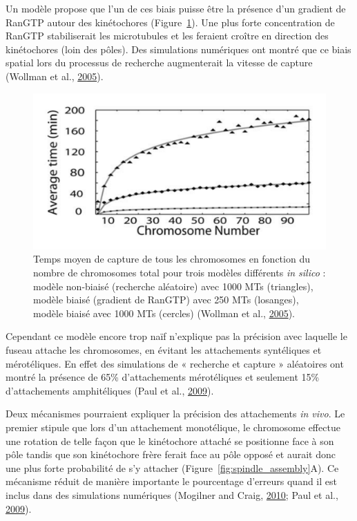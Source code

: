 \documentclass[12pt,a4paper,twoside,openright]{book}
\begin{document}
Un modèle propose que l'un de ces biais puisse être la présence d'un
gradient de RanGTP autour des kinétochores
(Figure~\ref{fig:assembly_time}). Une plus forte concentration de RanGTP
stabiliserait les microtubules et les feraient croître en direction des
kinétochores (loin des pôles). Des simulations numériques ont montré que
ce biais spatial lors du processus de recherche augmenterait la vitesse
de capture (Wollman et al., \hyperref[ref-Wollman2005]{2005}).

\begin{figure}[htbp]
\centering
\includegraphics{figures/intro/assembly_time.png}
\caption[Temps moyen de capture des chromosomes]{\label{fig:assembly_time}Temps
moyen de capture de tous les chromosomes en fonction du nombre de
chromosomes total pour trois modèles différents \emph{in silico} :
modèle non-biaisé (recherche aléatoire) avec 1000 MTs (triangles),
modèle biaisé (gradient de RanGTP) avec 250 MTs (losanges), modèle
biaisé avec 1000 MTs (cercles) (Wollman et al.,
\hyperref[ref-Wollman2005]{2005}).}
\end{figure}

Cependant ce modèle encore trop naïf n'explique pas la précision avec
laquelle le fuseau attache les chromosomes, en évitant les attachements
syntéliques et mérotéliques. En effet des simulations de « recherche et
capture » aléatoires ont montré la présence de 65\% d'attachements
mérotéliques et seulement 15\% d'attachements amphitéliques (Paul et
al., \hyperref[ref-Paul2009]{2009}).

Deux mécanismes pourraient expliquer la précision des attachements
\emph{in vivo}. Le premier stipule que lors d'un attachement
monotélique, le chromosome effectue une rotation de telle façon que le
kinétochore attaché se positionne face à son pôle tandis que son
kinétochore frère ferait face au pôle opposé et aurait donc une plus
forte probabilité de s'y attacher (Figure~\ref{fig:spindle_assembly}A).
Ce mécanisme réduit de manière importante le pourcentage d'erreurs quand
il est inclus dans des simulations numériques (Mogilner and Craig,
\hyperref[ref-Mogilner2010]{2010}; Paul et al.,
\hyperref[ref-Paul2009]{2009}).
\end{document}
